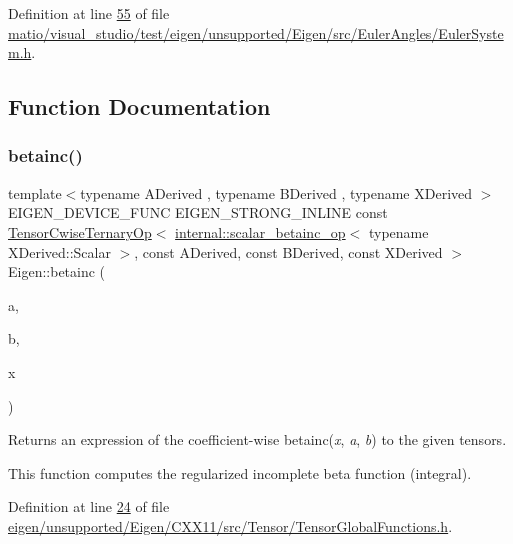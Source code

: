 Definition at line \hyperlink{matio_2visual__studio_2test_2eigen_2unsupported_2_eigen_2src_2_euler_angles_2_euler_system_8h_source_l00055}{55} of file \hyperlink{matio_2visual__studio_2test_2eigen_2unsupported_2_eigen_2src_2_euler_angles_2_euler_system_8h_source}{matio/visual\+\_\+studio/test/eigen/unsupported/\+Eigen/src/\+Euler\+Angles/\+Euler\+System.\+h}.



\subsection{Function Documentation}
\mbox{\label{namespace_eigen_a726eae91d4e91d8e25cbe55fffa6a92f}} 
\subsubsection{\texorpdfstring{betainc()}{betainc()}\hspace{0.1cm}{\footnotesize\ttfamily [1/2]}}
{\footnotesize\ttfamily template$<$typename A\+Derived , typename B\+Derived , typename X\+Derived $>$ \\
E\+I\+G\+E\+N\+\_\+\+D\+E\+V\+I\+C\+E\+\_\+\+F\+U\+NC E\+I\+G\+E\+N\+\_\+\+S\+T\+R\+O\+N\+G\+\_\+\+I\+N\+L\+I\+NE const \hyperlink{class_eigen_1_1_tensor_cwise_ternary_op}{Tensor\+Cwise\+Ternary\+Op}$<$ \hyperlink{struct_eigen_1_1internal_1_1scalar__betainc__op}{internal\+::scalar\+\_\+betainc\+\_\+op}$<$ typename X\+Derived\+::\+Scalar $>$, const A\+Derived, const B\+Derived, const X\+Derived $>$ Eigen\+::betainc (\begin{DoxyParamCaption}\item[{const A\+Derived \&}]{a,  }\item[{const B\+Derived \&}]{b,  }\item[{const X\+Derived \&}]{x }\end{DoxyParamCaption})}

\begin{DoxyReturn}{Returns}
an expression of the coefficient-\/wise betainc({\itshape x}, {\itshape a}, {\itshape b}) to the given tensors.
\end{DoxyReturn}
This function computes the regularized incomplete beta function (integral). 

Definition at line \hyperlink{eigen_2unsupported_2_eigen_2_c_x_x11_2src_2_tensor_2_tensor_global_functions_8h_source_l00024}{24} of file \hyperlink{eigen_2unsupported_2_eigen_2_c_x_x11_2src_2_tensor_2_tensor_global_functions_8h_source}{eigen/unsupported/\+Eigen/\+C\+X\+X11/src/\+Tensor/\+Tensor\+Global\+Functions.\+h}.

